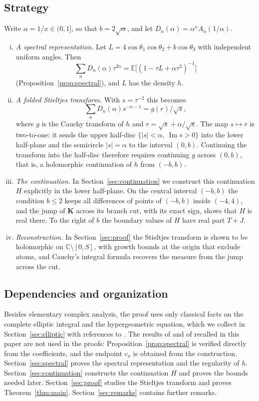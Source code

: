 \documentclass[11pt]{amsart}
\numberwithin{equation}{section}
\theoremstyle{definition}
\theoremstyle{remark}
\newcommand{\C}{\mathbb{C}}
\newcommand{\E}{\mathbb{E}}
\DeclareMathOperator{\im}{Im}
\newcommand{\Kc}{\mathbf{K}}
\begin{document}
\subsection*{Strategy}
Write $\alpha=1/x\in(0,1]$, so that $b=2\sqrt\alpha$, and let $D_n(\alpha)=\alpha^nA_n(1/\alpha)$.
\begin{enumerate}[(i)]
\item \emph{A spectral representation.} Let $L=4\cos\theta_1\cos\theta_2+b\cos\theta_3$ with independent
uniform angles. Then
\[
\textstyle\sum_n D_n(\alpha)\tau^{2n}=\E\bigl[(1-\tau L+\alpha\tau^2)^{-1}\bigr]
\]
(Proposition~\ref{prop:spectral}), and $L$ has the density $h$.
\item \emph{A folded Stieltjes transform.} With $s=\tau^{-2}$ this becomes
\[
\textstyle\sum_n D_n(\alpha)s^{-n-1}=g(r)/\sqrt s,
\]
where $g$ is the Cauchy transform of
$h$ and $r=\sqrt s+\alpha/\sqrt s$. The map $s\mapsto r$ is two-to-one: it
sends the upper half-disc $\{|s|<\alpha,\ \im s>0\}$ into the lower half-plane
and the semicircle $|s|=\alpha$ to the interval $(0,b)$. Continuing the
transform into the half-disc therefore requires continuing $g$ across $(0,b)$,
that is, a holomorphic continuation of $h$ from $(-b,b)$.
\item \emph{The continuation.} In Section~\ref{sec:continuation} we construct
this continuation $H$ explicitly in the lower half-plane. On the central
interval $(-b,b)$ the condition $b\le2$ keeps all differences of points of
$(-b,b)$ inside $(-4,4)$, and the jump of $\Kc$ across its branch cut, with
its exact sign, shows that $H$ is real there. To the right of $b$ the
boundary values of $H$ have real part $T+J$.
\item \emph{Reconstruction.} In Section~\ref{sec:proof} the Stieltjes transform
is shown to be holomorphic on $\C\setminus[0,S]$, with growth bounds at the
origin that exclude atoms, and Cauchy's integral formula recovers the measure
from the jump across the cut.
\end{enumerate}

\subsection*{Dependencies and organization}
Besides elementary complex analysis, the proof uses only classical facts on
the complete elliptic integral and the hypergeometric equation, which we
collect in Section~\ref{sec:elliptic} with references to \cite{DLMF}. The
results of \cite{Ed,Ne,St} and of \cite{DJ01,DJ06} recalled in this paper
are not used in the proofs: Proposition~\ref{prop:spectral} is verified
directly from the coefficients, and the endpoint $c_x$ is obtained from the
construction. Section~\ref{sec:spectral} proves the spectral
representation and the regularity of $h$. Section~\ref{sec:continuation}
constructs the continuation $H$ and proves the bounds needed later.
Section~\ref{sec:proof} studies the Stieltjes transform and proves
Theorem~\ref{thm:main}. Section~\ref{sec:remarks} contains further remarks.
\end{document}

